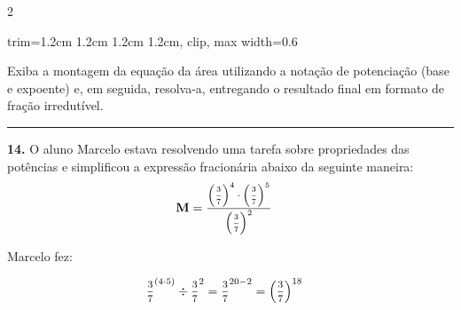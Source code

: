 \documentclass[twoside, 10pt, a4paper]{article}
\newlength{\espacoPreQuestao}\setlength{\espacoPreQuestao}{0.1cm}
\newlength{\espacoQuestao}\setlength{\espacoQuestao}{0.2cm}
\begin{document}
\begin{multicols*}{2}
\begin{center}
\begin{adjustbox}{trim=1.2cm 1.2cm 1.2cm 1.2cm, clip, max width=0.6\linewidth}
\end{adjustbox}
\end{center}
Exiba a montagem da equação da área utilizando a notação de potenciação (base e expoente) e, em seguida, resolva-a, entregando o resultado final em formato de fração irredutível.
\par\vspace{\espacoQuestao}

\noindent\textcolor{CorLinha}{\rule{\linewidth}{0.5pt}} 
\par\vspace{\espacoPreQuestao}
\textbf{14.} O aluno Marcelo estava resolvendo uma tarefa sobre propriedades das potências e simplificou a expressão fracionária abaixo da seguinte maneira:
$$
\begin{aligned}
& \textbf{M} = \mfrac{ \left( \mfrac{3}{7} \right)^{4} \cdot \left( \mfrac{3}{7} \right)^{5} }{ \left( \mfrac{3}{7} \right)^{2} }
\end{aligned}
$$
\par\vspace{0.2em}
Marcelo fez:
\par\vspace{0.2em}
$$
\begin{aligned}
& \mfrac{3}{7}^{(4 \cdot 5)} \div \mfrac{3}{7}^{2} = \mfrac{3}{7}^{20 - 2} = \left( \mfrac{3}{7} \right)^{18}
\end{aligned}
$$


\end{multicols*}
\end{document}
